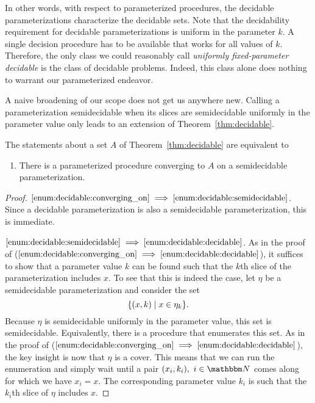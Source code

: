 In other words, with respect to parameterized procedures, the decidable parameterizations characterize the decidable sets.
Note that the decidability requirement for decidable parameterizations is uniform in the parameter $k$.
A single decision procedure has to be available that works for all values of $k$.
Therefore, the only class we could reasonably call \emph{uniformly fixed-parameter decidable} is the class of decidable problems.
Indeed, this class alone does nothing to warrant our parameterized endeavor.

A naive broadening of our scope does not get us anywhere new.
Calling a parameterization semidecidable when its slices are semidecidable uniformly in the parameter value only leads to an extension of Theorem~\ref{thm:decidable}.
\begin{theorem}
  The statements about a set $A$ of Theorem~\ref{thm:decidable} are equivalent to
  \begin{enumerate}
  \item\label{enum:decidable:semidecidable}
    There is a parameterized procedure converging to $A$ on a semidecidable parameterization.
  \end{enumerate}
\end{theorem}
\begin{proof}
$\ref{enum:decidable:converging_on} \implies \ref{enum:decidable:semidecidable}$.
  Since a decidable parameterization is also a semidecidable parameterization, this is immediate.

$\ref{enum:decidable:semidecidable} \implies \ref{enum:decidable:decidable}$.
  As in the proof of ($\ref{enum:decidable:converging_on} \implies \ref{enum:decidable:decidable}$), it suffices to show that a parameter value $k$ can be found such that the $k$th slice of the parameterization includes $x$.
  To see that this is indeed the case, let $\eta$ be a semidecidable parameterization and consider the set
  \begin{equation*}
    \{(x, k) \;{|}\; x \in \eta_k\}.
  \end{equation*}
  Because $\eta$ is semidecidable uniformly in the parameter value, this set is semidecidable.
  Equivalently, there is a procedure that enumerates this set.
  As in the proof of ($\ref{enum:decidable:converging_on} \implies \ref{enum:decidable:decidable}$), the key insight is now that $\eta$ is a cover.
  This means that we can run the enumeration and simply wait until a pair $(x_i, k_i),\ i \in \bbN$ comes along for which we have $x_i = x$.
  The corresponding parameter value $k_i$ is such that the $k_i$th slice of $\eta$ includes $x$.
\end{proof}

